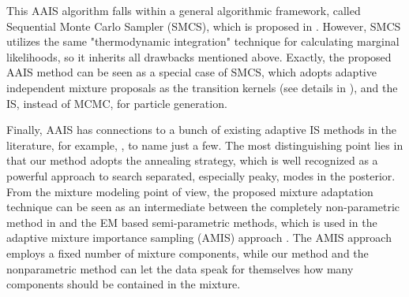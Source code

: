 This AAIS algorithm falls within a general algorithmic framework,
called Sequential Monte Carlo Sampler (SMCS), which is proposed in
\cite{del2007sequential,del2006sequential}. However, SMCS utilizes
the same "thermodynamic integration" technique for calculating
marginal likelihoods, so it inherits all drawbacks mentioned above.
Exactly, the proposed AAIS method can be seen as a special case of
SMCS, which adopts adaptive independent mixture proposals as the
transition kernels (see details in
\cite{del2007sequential,del2006sequential}), and the IS, instead of
MCMC, for particle generation.

Finally, AAIS has connections to a bunch of existing adaptive IS
methods in the literature, for example,
\cite{evans1991chaining,oh1993imf,cappe2008ais,cappe2004pmc,west1993mixture,ardia2008adaptive},
to name just a few. The most distinguishing point lies in that our
method adopts the annealing strategy, which is well recognized as a
powerful approach to search separated, especially peaky, modes in
the posterior. From the mixture modeling point of view, the proposed
mixture adaptation technique can be seen as an intermediate between
the completely non-parametric method in \cite{west1993mixture} and
the EM based semi-parametric methods, which is used in the adaptive
mixture importance sampling (AMIS) approach \citep{cappe2008ais}.
The AMIS approach employs a fixed number of mixture components,
while our method and the nonparametric method
\citep{west1993mixture} can let the data speak for themselves how
many components should be contained in the mixture.
